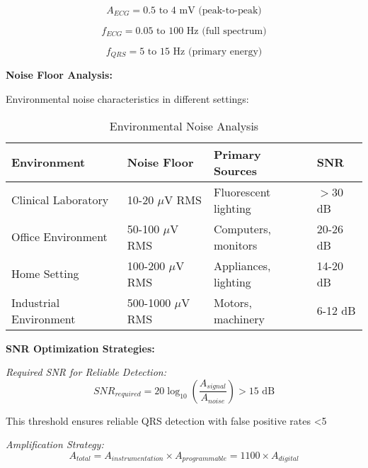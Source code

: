 \documentclass[12pt,a4paper]{article}
\begin{document}
\begin{equation*}
A_{ECG} = 0.5 \text{ to } 4 \text{ mV (peak-to-peak)}
\end{equation*}

\begin{equation*}
f_{ECG} = 0.05 \text{ to } 100 \text{ Hz (full spectrum)}
\end{equation*}

\begin{equation*}
f_{QRS} = 5 \text{ to } 15 \text{ Hz (primary energy)}
\end{equation*}

\vspace{0.3cm}

\textbf{Noise Floor Analysis:}

Environmental noise characteristics in different settings:

\begin{table}[h]
\centering
\caption{Environmental Noise Analysis}
\begin{tabular}{|l|l|l|l|}
\hline
\textbf{Environment} & \textbf{Noise Floor} & \textbf{Primary Sources} & \textbf{SNR} \\
\hline
Clinical Laboratory & 10-20 $\mu$V RMS & Fluorescent lighting & $>$30 dB \\
Office Environment & 50-100 $\mu$V RMS & Computers, monitors & 20-26 dB \\
Home Setting & 100-200 $\mu$V RMS & Appliances, lighting & 14-20 dB \\
Industrial Environment & 500-1000 $\mu$V RMS & Motors, machinery & 6-12 dB \\
\hline
\end{tabular}
\end{table}

\vspace{0.5cm}

\textbf{SNR Optimization Strategies:}

\textit{Required SNR for Reliable Detection:}
\begin{equation*}
SNR_{required} = 20 \log_{10}\left(\frac{A_{signal}}{A_{noise}}\right) > 15 \text{ dB}
\end{equation*}

This threshold ensures reliable QRS detection with false positive rates <5%

\textit{Amplification Strategy:}
\begin{equation*}
A_{total} = A_{instrumentation} \times A_{programmable} = 1100 \times A_{digital}
\end{equation*}
\end{document}
